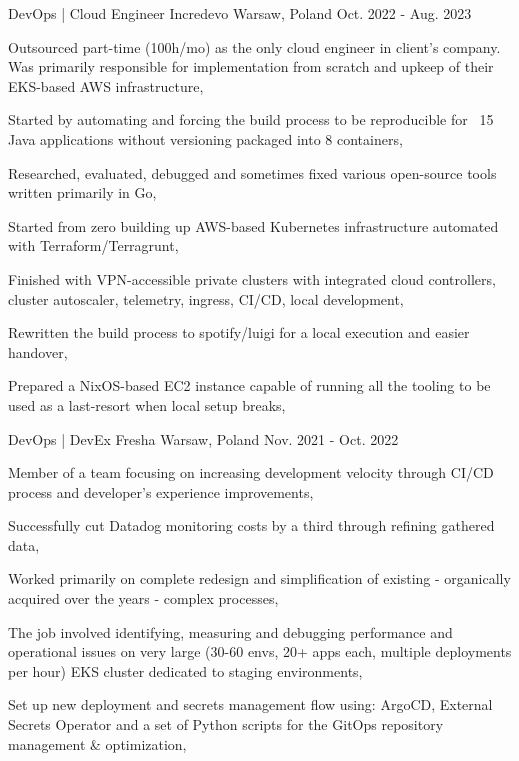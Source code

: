 \begin{cventries}
    \cventry
    {DevOps | Cloud Engineer} %
    {Incredevo} %
    {Warsaw, Poland} %
    {Oct. 2022 - Aug. 2023} %
    {
        \begin{cvitems} %
            \item {Outsourced part-time (100h/mo) as the only cloud engineer in client's company. Was primarily responsible for implementation from scratch and upkeep of their EKS-based AWS infrastructure,}
            \item {Started by automating and forcing the build process to be reproducible for ~15 Java applications without versioning packaged into 8 containers,}
            \item {Researched, evaluated, debugged and sometimes fixed various open-source tools written primarily in Go,}
            \item {Started from zero building up AWS-based Kubernetes infrastructure automated with Terraform/Terragrunt,}
            \item {Finished with VPN-accessible private clusters with integrated cloud controllers, cluster autoscaler, telemetry, ingress, CI/CD, local development,}
            \item {Rewritten the build process to spotify/luigi for a local execution and easier handover,}
            \item {Prepared a NixOS-based EC2 instance capable of running all the tooling to be used as a last-resort when local setup breaks,}
        \end{cvitems}
    }

    \cventry
    {DevOps | DevEx } %
    {Fresha} %
    {Warsaw, Poland} %
    {Nov. 2021 - Oct. 2022} %
    {
        \begin{cvitems} %
            \item {Member of a team focusing on increasing development velocity through CI/CD process and developer's experience improvements,}
            \item {Successfully cut Datadog monitoring costs by a third through refining gathered data,}
            \item {Worked primarily on complete redesign and simplification of existing - organically acquired over the years - complex processes,}
            \item {The job involved identifying, measuring and debugging performance and operational issues on very large (30-60 envs, 20+ apps each, multiple deployments per hour) EKS cluster dedicated to staging environments,}
            \item {Set up new deployment and secrets management flow using: ArgoCD, External Secrets Operator and a set of Python scripts for the GitOps repository management \& optimization,}
        \end{cvitems}
    }


\end{cventries}
